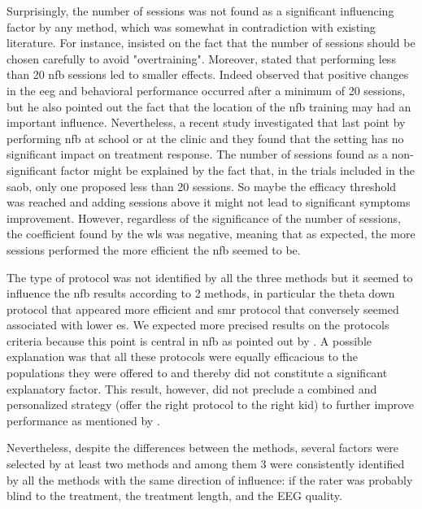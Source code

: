 Surprisingly, the number of sessions was not found as a significant influencing factor by any method, 
which was somewhat in contradiction with existing literature. For instance, \citet{Enriquez2017} insisted on the 
fact that the number of sessions should be chosen carefully to avoid "overtraining". Moreover, \citet{Arns2014} stated that 
performing less than 20 \gls{nfb} sessions led to smaller effects. Indeed \citet{Vernon2004} observed that positive 
changes in the \gls{eeg} and behavioral performance occurred after a minimum of 20 sessions, but he also pointed out the fact that the
location of the \gls{nfb} training may had an important influence. Nevertheless, a recent study investigated that last point by performing \gls{nfb} at school
or at the clinic \citep{Minder2018} and they found that the setting has no significant impact on treatment response. The number of sessions found as
a non-significant factor might be explained by the fact that, in the trials included in the \gls{saob}, only one proposed less than 20 sessions. So maybe the 
efficacy threshold was reached and adding sessions above it might not lead to significant symptoms improvement. However, regardless of the significance of the number of sessions, 
the coefficient found by the \gls{wls} was negative, meaning that as expected, the more sessions performed the more efficient the \gls{nfb} seemed to be. 

The type of protocol was not identified by all the three methods but it seemed to influence the \gls{nfb} results according to 2 methods,  
in particular the theta down protocol that appeared more efficient and \gls{smr} protocol that conversely seemed associated with lower \gls{es}. We expected 
more precised results on the protocols criteria because this point is central in \gls{nfb} as pointed out by \citet{Vernon2004}.
A possible explanation was that all these protocols were equally efficacious to the populations they were offered to and 
thereby did not constitute a significant explanatory factor. This result, however, did not preclude a combined and personalized strategy 
(offer the right protocol to the right kid) to further improve performance as mentioned by \citet{Alkoby2017}.

Nevertheless, despite the differences between the methods, several factors were selected by at least two methods and among them 3 were
consistently identified by all the methods with the same direction of influence: if the rater was probably blind to the treatment, the
treatment length, and the EEG quality. 

